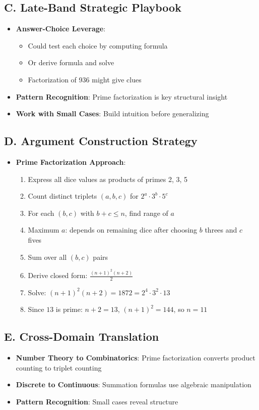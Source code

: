 \documentclass[12pt]{article}
\begin{document}
\begin{strategicbox}
\subsection*{C. Late-Band Strategic Playbook}
\begin{itemize}[leftmargin=*]
    \item \textbf{Answer-Choice Leverage}: 
    \begin{itemize}
        \item Could test each choice by computing formula
        \item Or derive formula and solve
        \item Factorization of 936 might give clues
    \end{itemize}
    \item \textbf{Pattern Recognition}: Prime factorization is key structural insight
    \item \textbf{Work with Small Cases}: Build intuition before generalizing
\end{itemize}

\subsection*{D. Argument Construction Strategy}
\begin{itemize}[leftmargin=*]
    \item \textbf{Prime Factorization Approach}: 
    \begin{enumerate}
        \item Express all dice values as products of primes 2, 3, 5
        \item Count distinct triplets $(a, b, c)$ for $2^a \cdot 3^b \cdot 5^c$
        \item For each $(b, c)$ with $b + c \leq n$, find range of $a$
        \item Maximum $a$: depends on remaining dice after choosing $b$ threes and $c$ fives
        \item Sum over all $(b, c)$ pairs
        \item Derive closed form: $\frac{(n+1)^2(n+2)}{2}$
        \item Solve: $(n+1)^2(n+2) = 1872 = 2^4 \cdot 3^2 \cdot 13$
        \item Since $13$ is prime: $n+2 = 13$, $(n+1)^2 = 144$, so $n = 11$
    \end{enumerate}
\end{itemize}

\subsection*{E. Cross-Domain Translation}
\begin{itemize}[leftmargin=*]
    \item \textbf{Number Theory to Combinatorics}: Prime factorization converts product counting to triplet counting
    \item \textbf{Discrete to Continuous}: Summation formulas use algebraic manipulation
    \item \textbf{Pattern Recognition}: Small cases reveal structure
\end{itemize}
\end{strategicbox}
\end{document}
